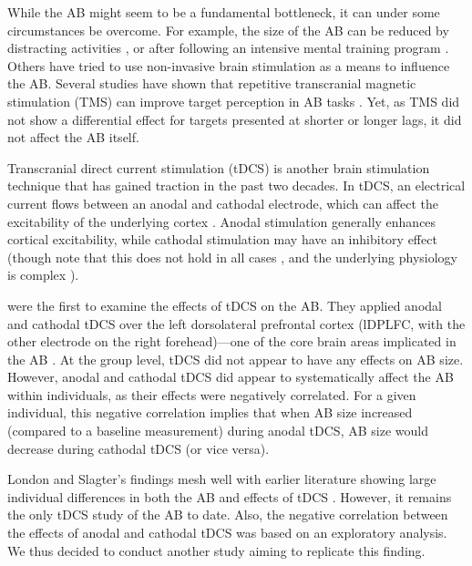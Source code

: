 \documentclass[11pt,]{memoir}
\begin{document}
While the AB might seem to be a fundamental bottleneck, it can under some circumstances be overcome. For example, the size of the AB can be reduced by distracting activities \autocites{Olivers2005}{Olivers2006}{Thomson2015a}, or after following an intensive mental training program \autocite{Slagter2007}. Others have tried to use non-invasive brain stimulation \autocite{Dayan2013} as a means to influence the AB. Several studies have shown that repetitive transcranial magnetic stimulation (TMS) can improve target perception in AB tasks \autocites{Cooper2004}{Arasanz2012}{Esterman2017}. Yet, as TMS did not show a differential effect for targets presented at shorter or longer lags, it did not affect the AB itself.

Transcranial direct current stimulation (tDCS) is another brain stimulation technique that has gained traction in the past two decades. In tDCS, an electrical current flows between an anodal and cathodal electrode, which can affect the excitability of the underlying cortex \autocite{Gebodh2019a}. Anodal stimulation generally enhances cortical excitability, while cathodal stimulation may have an inhibitory effect \autocites{Nitsche2000}{Nitsche2001} (though note that this does not hold in all cases \autocite{Parkin2018}, and the underlying physiology is complex \autocites{Bikson2019}{Liu2018}{Stagg2018}).

\textcite{London2015} were the first to examine the effects of tDCS on the AB. They applied anodal and cathodal tDCS over the left dorsolateral prefrontal cortex (lDPLFC, with the other electrode on the right forehead)---one of the core brain areas implicated in the AB \autocites{Slagter2010}{Hommel2006}. At the group level, tDCS did not appear to have any effects on AB size. However, anodal and cathodal tDCS did appear to systematically affect the AB within individuals, as their effects were negatively correlated. For a given individual, this negative correlation implies that when AB size increased (compared to a baseline measurement) during anodal tDCS, AB size would decrease during cathodal tDCS (or vice versa).

London and Slagter's \autocite*{London2015} findings mesh well with earlier literature showing large individual differences in both the AB \autocite{Willems2016} and effects of tDCS \autocite{Krause2014}. However, it remains the only tDCS study of the AB to date. Also, the negative correlation between the effects of anodal and cathodal tDCS was based on an exploratory analysis. We thus decided to conduct another study aiming to replicate this finding.
\end{document}
